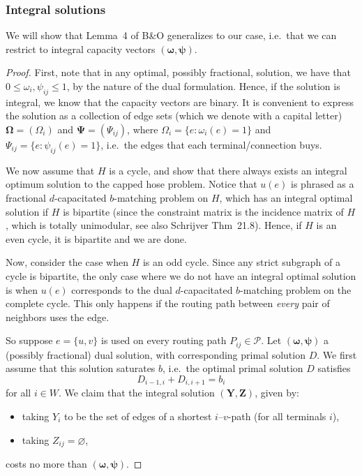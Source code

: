 \subsubsection*{Integral solutions}
We will show that Lemma~4 of B\&O generalizes to our case, i.e.\ that we can restrict to integral capacity vectors $(\boldsymbol \omega, \boldsymbol \psi)$.
\begin{proof}
    First, note that in any optimal, possibly fractional, solution, we have that $0 \le \omega_i, \psi_{ij} \le 1$, by the nature of the dual formulation.
    Hence, if the solution is integral, we know that the capacity vectors are binary.
    It is convenient to express the solution as a collection of edge sets (which we denote with a capital letter) $\boldsymbol \Omega = (\Omega_i)$ and $\boldsymbol \Psi = (\Psi_{ij})$, where $\Omega_i = \{ e : \omega_i(e) = 1 \}$ and $\Psi_{ij} = \{ e : \psi_{ij}(e) = 1 \}$, i.e.\ the edges that each terminal/connection buys.

    We now assume that $H$ is a cycle, and show that there always exists an integral optimum solution to the capped hose problem.
    Notice that $u(e)$ is phrased as a fractional $d$-capacitated $b$-matching problem on $H$, which has an integral optimal solution if $H$ is bipartite (since the constraint matrix is the incidence matrix of $H$, which is totally unimodular, see also Schrijver Thm~21.8).
    Hence, if $H$ is an even cycle, it is bipartite and we are done.

    Now, consider the case when $H$ is an odd cycle.
    Since any strict subgraph of a cycle is bipartite, the only case where we do not have an integral optimal solution is when $u(e)$ corresponds to the dual $d$-capacitated $b$-matching problem on the complete cycle.
    This only happens if the routing path between \emph{every} pair of neighbors uses the edge.

    So suppose $e = \{u, v\}$ is used on every routing path $P_{ij} \in \mathcal P$.
    Let $(\boldsymbol \omega, \boldsymbol \psi)$ a (possibly fractional) dual solution, with corresponding primal solution $D$.
    We first assume that this solution saturates $b$, i.e.\ the optimal primal solution $D$ satisfies
    \[
        D_{i-1,i} + D_{i,i+1} = b_i
    \]
    for all $i \in W$.
    We claim that the integral solution $(\boldsymbol Y, \boldsymbol Z)$, given by:
    \begin{itemize}
        \item taking $Y_i$ to be the set of edges of a shortest $i$--$v$-path (for all terminals $i$),
        \item taking $Z_{ij} = \varnothing$,
    \end{itemize}
    costs no more than $(\boldsymbol \omega, \boldsymbol \psi)$.


\end{proof}

